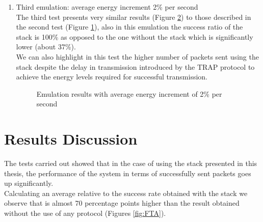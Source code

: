 \begin{enumerate}
\begin{figure}[H]
\label{fig:SGST0}
\end{figure}
\begin{comment}
\begin{figure}[H]
\centerline{\psfig{file=Images/7560125RATIO.png,width=0.7\textwidth}}
\caption{\footnotesize \centering Success ratio of transmission with average energy increment of 1.25\% per second}
\label{fig:SGST1}
\end{figure}
\end{comment}
\item Third emulation: average energy increment 2\% per second\\
The third test presents very similar results (Figure \ref{fig:SGTT0}) to those described in the second test (Figure \ref{fig:SGST0}), also in this emulation the success ratio of the stack is 100\% as opposed to the one without the stack which is significantly lower (about 37\%).\\
We can also highlight in this test the higher number of packets sent using the stack despite the delay in transmission introduced by the TRAP protocol to achieve the energy levels required for successful transmission.
\begin{figure}[H]
\centerline{}
\caption{\footnotesize \centering Emulation results with average energy increment of 2\% per second}
\label{fig:SGTT0}
\end{figure}
\begin{comment}
\begin{figure}[H]
\centerline{\psfig{file=Images/7560125RATIO.png,width=0.7\textwidth}}
\caption{\footnotesize \centering Success ratio of transmission with average energy increment of 2\% per second}
\label{fig:SGTT1}
\end{figure}
\end{comment}
\end{enumerate}
\section{Results Discussion}
\label{sec:SimulationDiscussion}
The tests carried out showed that in the case of using the stack presented in this thesis, the performance of the system in terms of successfully sent packets goes up significantly.\\
Calculating an average relative to the success rate obtained with the stack we observe that is almost 70 percentage points higher than the result obtained without the use of any protocol (Figures \ref{fig:FTA}).

